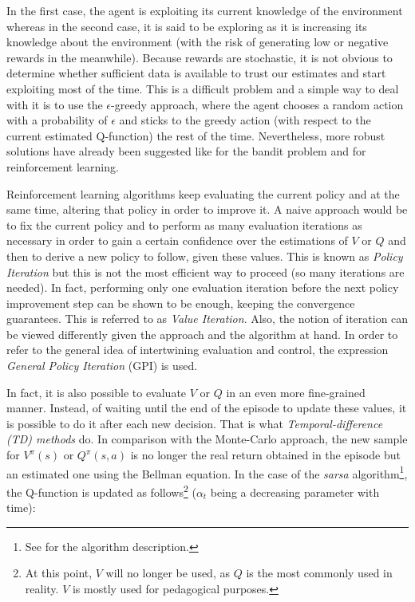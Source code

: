 				In the first case, the agent is exploiting its current knowledge of the environment whereas in the second case, it is said to be exploring as it is increasing its knowledge about the environment (with the risk of generating low or negative rewards in the meanwhile). Because rewards are stochastic, it is not obvious to determine whether sufficient data is available to trust our estimates and start exploiting most of the time. This is a difficult problem and a simple way to deal with it is to use the $\epsilon$-greedy approach, where the agent chooses a random action with a probability of $\epsilon$ and sticks to the greedy action (with respect to the current estimated Q-function) the rest of the time. Nevertheless, more robust solutions have already been suggested like \cite{Auer2002} for the bandit problem and \cite{Auer2005} for reinforcement learning.
				
				Reinforcement learning algorithms keep evaluating the current policy and at the same time, altering that policy in order to improve it. A naive approach would be to fix the current policy and to perform as many evaluation iterations as necessary in order to gain a certain confidence over the estimations of $V$ or $Q$ and then to derive a new policy to follow, given these values. This is known as \textit{Policy Iteration} but this is not the most efficient way to proceed (so many iterations are needed). In fact, performing only one evaluation iteration before the next policy improvement step can be shown to be enough, keeping the convergence guarantees. This is referred to as \textit{Value Iteration}. Also, the notion of iteration can be viewed differently given the approach and the algorithm at hand. In order to refer to the general idea of intertwining evaluation and control, the expression \textit{General Policy Iteration} (GPI) is used.
				
				In fact, it is also possible to evaluate $V$ or $Q$ in an even more fine-grained manner. Instead, of waiting until the end of the episode to update these values, it is possible to do it after each new decision. That is what \textit{Temporal-difference (TD) methods} do. In comparison with the Monte-Carlo approach, the new sample for $V^\pi(s)$ or $Q^\pi(s,a)$ is no longer the real return obtained in the episode but an estimated one using the Bellman equation. In the case of the \textit{sarsa} algorithm\footnote{See \cite{Sutton1998} for the algorithm description.}, the Q-function is updated as follows\footnote{At this point, $V$ will no longer be used, as $Q$ is the most commonly used in reality. $V$ is mostly used for pedagogical purposes.} ($\alpha_t$ being a decreasing parameter with time):
				

